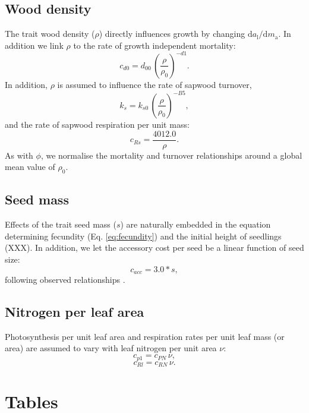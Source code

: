 \documentclass[10pt,twoside]{article}
\begin{document}
\subsection{Wood density}

The trait wood density ($\rho$) directly influences growth by changing 
$\textrm{d}a_\textrm{l} / \textrm{d}m_\textrm{a}$.  In addition we  
link $\rho$ to the rate of growth independent mortality:
$$c_{d0}=d_{00} \, \left(\frac{\rho}{\rho_0}\right) ^ {-d1}.$$
In addition, $\rho$ is assumed to influence the rate of sapwood turnover, 
$$k_s=k_{s0} \, \left(\frac{\rho}{\rho_0}\right)^ {-B5},$$
and the rate of sapwood respiration per unit mass:
$$c_{Rs} = \frac{4012.0}{\rho}.$$
As with $\phi$, we normalise the mortality and turnover 
relationships around a global mean value of $\rho_0$. 

\subsection{Seed mass}

Effects of the trait seed mass ($s$) are naturally embedded in the equation determining 
fecundity (Eq. \ref{eq:fecundity}) and the initial height of seedlings (XXX). In addition,
we let the accessory cost per seed be a linear function of seed size:
$$c_{acc} = 3.0 * s,$$
following observed relationships \citep{Henery-2001}.

\subsection{Nitrogen per leaf area}

Photosynthesis per unit leaf area and respiration rates per unit leaf mass (or area) 
are assumed to vary with leaf nitrogen per unit area $\nu$:
$$c_{p1}=c_{PN} \, \nu,$$
$$c_{Rl}=c_{RN}  \, \nu.$$

\clearpage

\section{Tables}\label{tables}
\end{document}
